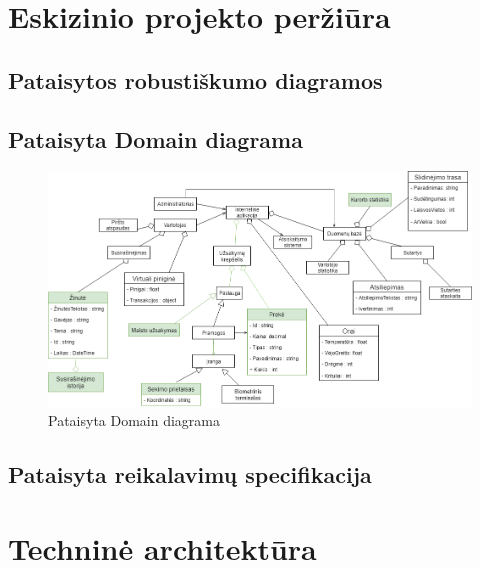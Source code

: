 \documentclass[oneside]{VUMIFPSkursinis}
\begin{document}
\section{Eskizinio projekto peržiūra}
\subsection{Pataisytos robustiškumo diagramos}
\subsection{Pataisyta Domain diagrama}
\begin{figure}[h]
    \centering
    \includegraphics[width=1.0\textwidth]{domainfixed.png}
    \caption{Pataisyta Domain diagrama}
    \label{fig:domainfixed}
\end{figure}
\vskip 1cm
\subsection{Pataisyta reikalavimų specifikacija}

\section{Techninė architektūra}
\end{document}
